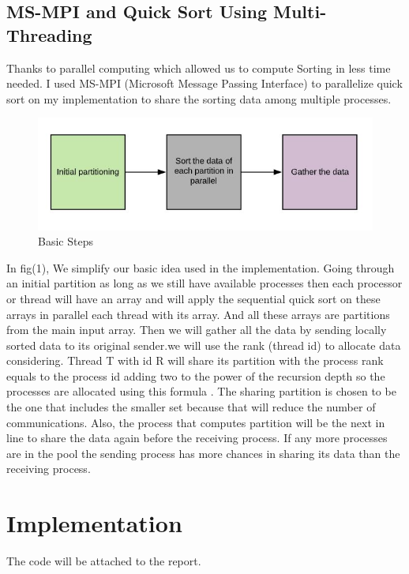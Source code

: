 \documentclass[preprint,pre,floats,aps,amsmath,amssymb]{revtex4}
\begin{document}
\subsection{MS-MPI and Quick Sort Using Multi-Threading}
Thanks to parallel computing which allowed us to compute Sorting in less time needed.
I used MS-MPI (Microsoft Message Passing Interface) to parallelize quick sort on my implementation to share the sorting data among multiple processes.
\begin{figure}[h]
	\centering
	\caption{Basic Steps} 
	\includegraphics[scale=0.5]{1}
\end{figure}
In fig(1), We simplify our basic idea used in the implementation. Going through an initial partition as long as we still have available processes then each processor or thread will have an array and will apply the sequential quick sort on these arrays in parallel each thread with its array. And all these arrays are partitions from the main input array. Then we will gather all the data by sending locally sorted data to its original sender.we will use the rank (thread id) to allocate data considering.
Thread T with id R will share its partition with the process rank equals to the process id adding two to the power of the recursion depth so the processes are allocated using this formula \cite{quicksort}.
The sharing partition is chosen to be the one that includes the smaller set because that will reduce the number of communications. Also, the process that computes partition will be the next in line to share the data again before the receiving process. If any more processes are in the pool the sending process has more chances in sharing its data than the receiving process.

\newpage      
\section{Implementation}
\label{sec:implementation }
The code will be attached to the report.
\end{document}
